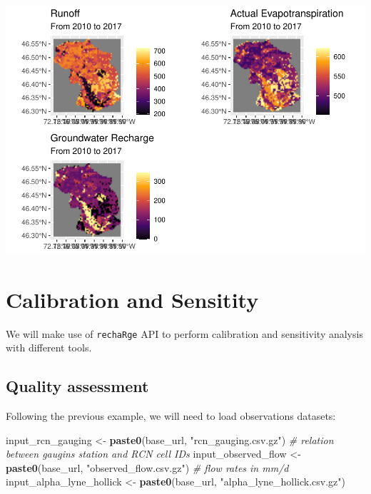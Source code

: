 \documentclass[
]{book}
\newenvironment{Shaded}{\begin{snugshade}}{\end{snugshade}}
\newcommand{\CommentTok}[1]{\textcolor[rgb]{0.56,0.35,0.01}{\textit{#1}}}
\newcommand{\FunctionTok}[1]{\textcolor[rgb]{0.13,0.29,0.53}{\textbf{#1}}}
\newcommand{\NormalTok}[1]{#1}
\newcommand{\OtherTok}[1]{\textcolor[rgb]{0.56,0.35,0.01}{#1}}
\newcommand{\StringTok}[1]{\textcolor[rgb]{0.31,0.60,0.02}{#1}}
\begin{document}
\includegraphics{fig/sim-viz-rasters-1.pdf}

\hypertarget{calibration-and-sensitity}{%
\chapter{Calibration and Sensitity}\label{calibration-and-sensitity}}

We will make use of \texttt{rechaRge} API to perform calibration and sensitivity analysis with different tools.

\hypertarget{quality-assessment}{%
\section{Quality assessment}\label{quality-assessment}}

Following the previous example, we will need to load observations datasets:

\begin{Shaded}
\begin{Highlighting}[]
\NormalTok{input\_rcn\_gauging }\OtherTok{\textless{}{-}} \FunctionTok{paste0}\NormalTok{(base\_url, }\StringTok{"rcn\_gauging.csv.gz"}\NormalTok{) }\CommentTok{\# relation between gaugins station and RCN cell IDs}
\NormalTok{input\_observed\_flow }\OtherTok{\textless{}{-}} \FunctionTok{paste0}\NormalTok{(base\_url, }\StringTok{"observed\_flow.csv.gz"}\NormalTok{) }\CommentTok{\# flow rates in mm/d}
\NormalTok{input\_alpha\_lyne\_hollick }\OtherTok{\textless{}{-}} \FunctionTok{paste0}\NormalTok{(base\_url, }\StringTok{"alpha\_lyne\_hollick.csv.gz"}\NormalTok{)}
\end{Highlighting}
\end{Shaded}
\end{document}
